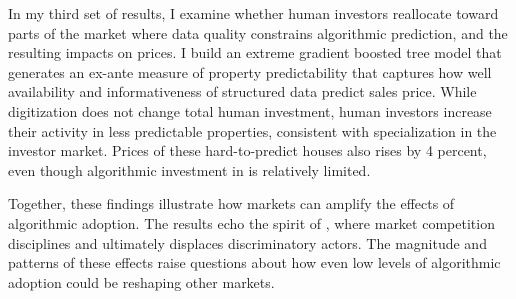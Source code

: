 \documentclass[11pt]{article}
\begin{document}
In my third set of results, I examine whether human investors reallocate toward parts of the market where data quality constrains algorithmic prediction, and the resulting impacts on prices. I build an extreme gradient boosted tree model that generates an ex-ante measure of property predictability that captures how well availability and informativeness of structured data predict sales price. While digitization does not change total human investment, human investors increase their activity in less predictable properties, consistent with specialization in the investor market.  Prices of these hard-to-predict houses also rises by 4 percent, even though algorithmic investment in is relatively limited.

Together, these findings illustrate how markets can amplify the effects of algorithmic adoption. The results echo the spirit of \citet{becker1957}, where market competition disciplines and ultimately displaces discriminatory actors. The magnitude and patterns of these effects raise questions about how even low levels of algorithmic adoption could be reshaping other markets.
\end{document}
